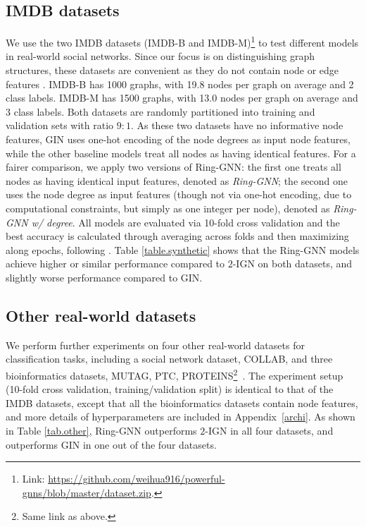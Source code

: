 \documentclass{article}
\begin{document}
\subsection{IMDB datasets} \label{sec.imbdb}
We use the two IMDB datasets (IMDB-B and IMDB-M)\footnote{Link: \url{https://github.com/weihua916/powerful-gnns/blob/master/dataset.zip}.} to test different models in real-world social networks. Since our focus is on distinguishing graph structures, these datasets are convenient as they do not contain node or edge features \cite{yanardag2015deep}.
IMDB-B has 1000 graphs, with 19.8 nodes per graph on average and 2 class labels. IMDB-M has 1500 graphs, with 13.0 nodes per graph on average and 3 class labels. 
Both datasets are randomly partitioned into training and validation sets with ratio $9 : 1$. 
As these two datasets have no informative node features, GIN uses one-hot encoding of the node degrees as input node features, while the other baseline models treat all nodes as having identical features. For a fairer comparison, we apply two versions of Ring-GNN: the first one treats all nodes as having identical input features, denoted as \emph{Ring-GNN}; the second one uses the node degree as input features (though not via one-hot encoding, due to computational constraints, but simply as one integer per node), denoted as \emph{Ring-GNN w/ degree}. All models are evaluated via 10-fold cross validation and the best accuracy is calculated through averaging across folds and then maximizing along epochs, following \cite{xu2018powerful}. Table \ref{table.synthetic} shows that the Ring-GNN models achieve higher or similar performance compared to $2$-IGN on both datasets, and slightly worse performance compared to GIN. 

\subsection{Other real-world datasets}
We perform further experiments on four other real-world datasets for classification tasks, including a social network dataset, COLLAB, and three bioinformatics datasets, MUTAG, PTC, PROTEINS\footnote{Same link as above.}~\cite{yanardag2015deep}. The experiment setup (10-fold cross validation, training/validation split) is identical to that of the IMDB datasets, except that all the bioinformatics datasets contain node features, and more details of hyperparameters are included in Appendix~\ref{archi}. As shown in Table \ref{tab.other}, Ring-GNN outperforms $2$-IGN in all four datasets, and outperforms GIN in one out of the four datasets. 
\end{document}
